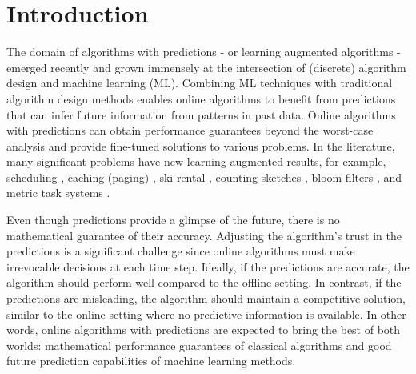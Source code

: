 
\section{Introduction}


The domain of algorithms with predictions \cite{MitzenmacherVassilvitskii20:Beyond-the-Worst-Case} - or learning augmented algorithms - emerged recently and grown immensely at the intersection of (discrete) algorithm design and machine learning (ML).
Combining ML techniques with traditional algorithm design methods enables online algorithms to benefit from predictions that can infer future information from patterns in past data. Online algorithms with predictions can obtain performance guarantees beyond the worst-case analysis and provide fine-tuned solutions to various problems. In the literature, many significant problems have new learning-augmented results, for example, scheduling \cite{LattanziLavastida20:Online-scheduling,Mitzenmacher20:Scheduling-with}, caching (paging) \cite{LykourisVassilvtiskii18:Competitive-caching,Rohatgi20:Near-optimal-bounds,AntoniadisCoester20:Online-metric}, ski rental \cite{GollapudiPanigrahi19:Online-algorithms,KumarPurohit18:Improving-online,AngelopoulosDurr20:Online-Computation}, counting sketches \cite{HsuIndyk19:Learning-Based-Frequency}, bloom filters \cite{KraskaBeutel18:The-case-for-learned,Mitzenmacher18:A-model-for-learned}, and metric task systems \cite{AntoniosEtAll23:mixing-predictions-metric-algorithms}.

Even though predictions provide a glimpse of the future, there is no mathematical guarantee of their accuracy. Adjusting the algorithm's trust in the predictions is a significant challenge since online algorithms must make irrevocable decisions at each time step. Ideally, if the predictions are accurate, the algorithm should perform well compared to the offline setting. In contrast, if the predictions are misleading, the algorithm should maintain a competitive solution, similar to the online setting where no predictive information is available. In other words, online algorithms with predictions are expected to bring the best of both worlds: mathematical performance guarantees of classical algorithms and good future prediction capabilities of machine learning methods.

